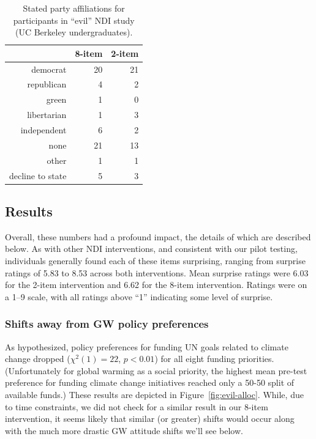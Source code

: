 \begin{table}[ht]
\caption{Stated party affiliations for participants in “evil” NDI study (UC
    Berkeley undergraduates).}
\label{table:evil-party}
\centering
\begin{tabular}{rrr}
  \toprule
     & 8-item & 2-item \\ 
  \midrule
  democrat &  20 &  21 \\ 
  republican &   4 &   2 \\ 
  green &   1 &   0 \\ 
  libertarian &   1 &   3 \\ 
  independent &   6 &   2 \\ 
  none &  21 &  13 \\ 
  other &   1 &   1 \\ 
  decline to state &   5 &   3 \\ 
   \bottomrule
\end{tabular}
\end{table}
\subsection{Results}

Overall, these numbers had a profound impact, the details of which are described
below. As with other NDI interventions, and consistent with our pilot testing,
individuals generally found each of these items surprising, ranging from
surprise ratings of 5.83 to 8.53 across both interventions. Mean surprise
ratings were 6.03 for the 2-item intervention and 6.62 for the 8-item
intervention. Ratings were on a 1--9 scale, with all ratings above “1”
indicating some level of surprise.

\subsubsection{Shifts away from GW policy preferences}

As hypothesized, policy preferences for funding UN goals related to climate
change dropped ($\chi^2(1)=22$, $p<0.01$) for all eight funding priorities.
(Unfortunately for global warming as a social priority, the highest mean
pre-test preference for funding climate change initiatives reached only a 50-50
split of available funds.) These results are depicted in
Figure~\ref{fig:evil-alloc}. While, due to time constraints, we did not check
for a similar result in our 8-item intervention, it seems likely that similar
(or greater) shifts would occur along with the much more drastic GW attitude
shifts we'll see below.

